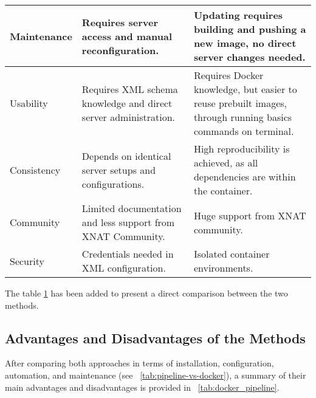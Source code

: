 \begin{table}[H]
\begin{tabular}{|>{\centering\arraybackslash}p{4cm}|
                    >{\centering\arraybackslash}p{5cm}|
                    >{\centering\arraybackslash}p{5cm}|}
Maintenance & Requires server access and manual reconfiguration.& Updating requires building and pushing a new image, no direct server changes needed.\\ \hline
Usability& Requires XML schema knowledge and direct server administration.& Requires Docker knowledge, but easier to reuse prebuilt images, through running basics commands on terminal.\\ \hline
Consistency& Depends on identical server setups and configurations.& High reproducibility is achieved, as all dependencies are within the container.\\ \hline
Community& Limited documentation and less support from XNAT Community.& Huge support from XNAT community.\\ \hline
Security& Credentials needed in XML configuration.& Isolated container environments.\\ \hline
    \end{tabular}
    \label{tab:pipeline-vs-docker}
\end{table}
 The table \ref{tab:pipeline-vs-docker} has been added to present a direct comparison between the two methods.
 
 \subsection{Advantages and Disadvantages of the Methods}

After comparing both approaches in terms of installation, configuration, automation, and maintenance (see ~\autoref{tab:pipeline-vs-docker}), a summary of their main advantages and disadvantages is provided in ~\autoref{tab:docker_pipeline}.

